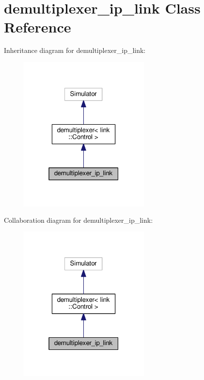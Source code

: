 \hypertarget{classdemultiplexer__ip__link}{}\section{demultiplexer\+\_\+ip\+\_\+link Class Reference}
\label{classdemultiplexer__ip__link}


Inheritance diagram for demultiplexer\+\_\+ip\+\_\+link\+:\nopagebreak
\begin{figure}[H]
\begin{center}
\leavevmode
\includegraphics[width=187pt]{classdemultiplexer__ip__link__inherit__graph}
\end{center}
\end{figure}


Collaboration diagram for demultiplexer\+\_\+ip\+\_\+link\+:\nopagebreak
\begin{figure}[H]
\begin{center}
\leavevmode
\includegraphics[width=187pt]{classdemultiplexer__ip__link__coll__graph}
\end{center}
\end{figure}
